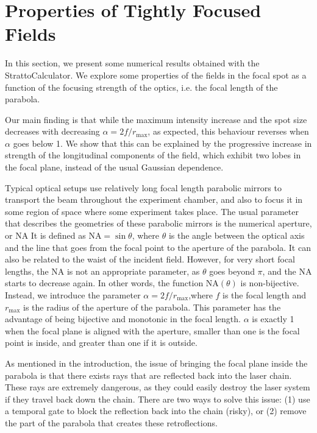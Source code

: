\documentclass[11pt,SymmetricalJury]{inrsthesis/inrsthesis}
\begin{document}
\section{Properties of Tightly Focused Fields}

In this section, we present some numerical results obtained with the
StrattoCalculator. We explore some properties of the fields in the focal
spot as a function of the focusing strength of the optics, i.e. the
focal length of the parabola.

Our main finding is that while the maximum intensity increase and the spot
size decreases with decreasing $\alpha=2f/r_\text{max}$, as expected, this
behaviour reverses when $\alpha$ goes below 1. We show that this can be
explained by the progressive increase in strength of the longitudinal components
of the field, which exhibit two lobes in the focal plane, instead of the usual
Gaussian dependence.


Typical optical setups use relatively long focal length parabolic mirrors to
transport the beam throughout the experiment chamber, and also to focus it in
some region of space where some experiment takes place. The usual parameter that
describes the geometries of these parabolic mirrors is the numerical aperture,
or NA­ It is defined as $\text{NA}=\sin\theta$, where $\theta$ is the angle
between the optical axis and the line that goes from the focal point to the
aperture of the parabola. It can also be related to the waist of the incident
field. However, for very short focal lengths, the NA is not an appropriate
parameter, as $\theta$ goes beyond $\pi$, and the NA starts to decrease again.
In other words, the function $\text{NA}(\theta)$ is non-bijective. Instead, we
introduce the parameter $\alpha=2f/r_ \text{max}$,where $f$ is the focal length
and $r_\text{max}$ is the radius of the aperture of the parabola. This parameter
has the advantage of being bijective and monotonic in the focal length. $\alpha$
is exactly 1 when the focal plane is aligned with the aperture, smaller than one
is the focal point is inside, and greater than one if it is outside.

As mentioned in the introduction, the issue of bringing the focal plane inside
the parabola is that there exists rays that are reflected back into the laser
chain. These rays are extremely dangerous, as they could easily destroy the
laser system if they travel back down the chain. There are two ways to solve
this issue: (1) use a temporal gate to block the reflection back into the chain
(risky), or (2) remove the part of the parabola that creates these
retroflections.
\end{document}
